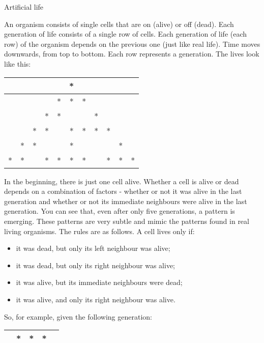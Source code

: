 		Artificial life
		\begin{EXE}
			\item {} An organism consists of single cells that are on (alive) or off (dead). Each generation of life consists of a single row of cells. Each generation of life (each row) of the organism depends on the previous one (just like real life). Time moves downwards, from top to bottom. Each row represents a generation. The lives look like this:
				\begin{center}
					\begin{tabular}{|c|c|c|c|c|c|c|c|c|c|c|}
						\hline
						& 	& 	& 	& 	& * & 	& 	& 	& 	& \\ \hline
						& 	& 	& 	& *	& *	& * & 	& 	& 	& \\ \hline
						& 	& 	& * & *	&		& 	& * & 	& 	& \\ \hline
						& 	& *	& *	&	 	& * &	*	& *	& * & 	& \\ \hline
						&	*	& *	&		&   & *	&		&	 	& 	& * & \\ \hline
					*	& *	&	  & *	& * &	*	& *	&	  & *	& *	& *\\ \hline
					\end{tabular}
				\end{center}
				In the beginning, there is just one cell alive. Whether a cell is alive or dead depends on a combination of factors - whether or not it was alive in the last generation and whether or not its immediate neighbours were alive in the last generation. You can see that, even after only five generations, a pattern is emerging. These patterns are very subtle and mimic the patterns found in real living organisms. The rules are as follows.
				A cell lives only if:
				\begin{itemize}
		      \item it was dead, but only its left neighbour was alive;
     			\item it was dead, but only its right neighbour was alive;
		      \item it was alive, but its immediate neighbours were dead;
		      \item it was alive, and only its right neighbour was alive.
				\end{itemize}
				So, for example, given the following generation:
				\begin{center}
					\begin{tabular}{|c|c|c|c|c|}
						\hline
							& *	& *	& *	& \\ \hline
					\end{tabular}
				\end{center}


\end{EXE}
